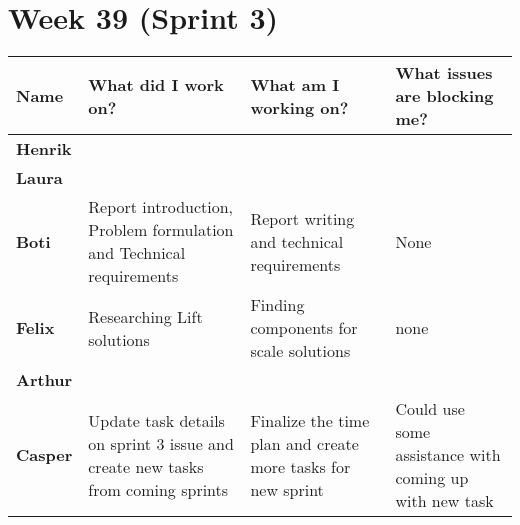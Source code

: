 \documentclass[landscape]{article}
\begin{document}
    \section{Week 39 (Sprint 3)}
    \begin{table}[H]
        \begin{center}
            \begin{tabularx}{\linewidth}{L|L|L|L}
                
                \textbf{Name} & \textbf{What did I work on?} & \textbf{What am I working on? }& \textbf{What issues are blocking me?} \\
                \hline
                \textbf{Henrik} & & & \\
                \hline
                \textbf{Laura} & & & \\
                \hline
                \textbf{Boti} & Report introduction, Problem formulation and Technical requirements & Report writing and technical requirements & None \\
                \hline
                \textbf{Felix} & Researching Lift solutions  & Finding components for scale solutions& none   \\
                \hline
                \textbf{Arthur} & & & \\
                \hline
                \textbf{Casper} & Update task details on sprint 3 issue and
                create new tasks from coming sprints & Finalize the time plan
                and create more tasks for new sprint & Could use some assistance
                with coming up with new task
            \end{tabularx}
        \end{center}
    \end{table}
\end{document}
